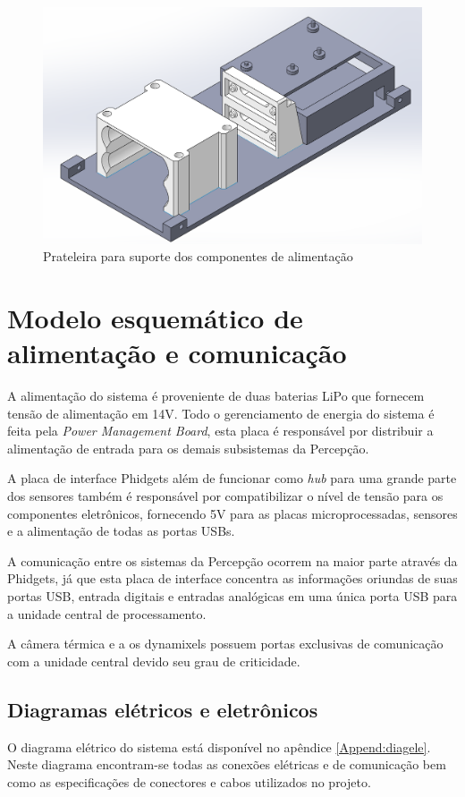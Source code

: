 \begin{figure}[h]
	\centering
	\includegraphics[width=14cm]{Figures/pecadebaixo.png}
	\caption{Prateleira para suporte dos componentes de alimentação} \label{pecaaliment}
\end{figure}

\section{Modelo esquemático de alimentação e comunicação}
\label{sec:modesq}

A alimentação do sistema é proveniente de duas baterias LiPo que fornecem tensão de alimentação em 14V. Todo o gerenciamento de energia do sistema é feita pela \textit{Power Management Board}, esta placa é responsável por distribuir a alimentação de entrada para os demais subsistemas da Percepção. 

A placa de interface Phidgets além de funcionar como \textit{hub} para uma grande parte dos sensores também é responsável por compatibilizar o nível de tensão para os componentes eletrônicos, fornecendo 5V para as placas microprocessadas, sensores e a alimentação de todas as portas USBs. 

A comunicação entre os sistemas da Percepção ocorrem na maior parte  através da Phidgets, já que esta placa de interface concentra as informações oriundas de suas portas USB, entrada digitais e entradas analógicas em uma única porta USB para a unidade central de processamento.

 A câmera térmica e a os dynamixels possuem portas exclusivas de comunicação com a unidade central devido seu grau de criticidade.

\subsection{Diagramas elétricos e eletrônicos}
\label{sec:diage}
O diagrama elétrico do sistema está disponível no apêndice \ref{Append:diagele}. Neste diagrama encontram-se todas as conexões elétricas e de comunicação bem como as especificações de conectores e cabos utilizados no projeto.


